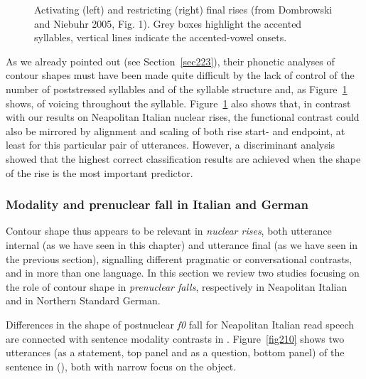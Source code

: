 \begin{figure}
\centering
{}
\caption{Activating (left) and restricting (right) final rises (from Dombrowski and Niebuhr 2005, Fig. 1). Grey boxes highlight the accented syllables, vertical lines indicate the accented-vowel onsets.}
\label{fig209}\end{figure}

As we already pointed out (see Section~\ref{sec223}), their phonetic analyses of contour shapes must have been made quite difficult by the lack of control of the number of poststressed syllables and of the syllable structure and, as Figure~\ref{fig209} shows, of voicing throughout the syllable. Figure~\ref{fig209} also shows that, in contrast with our results on Neapolitan Italian nuclear rises, the functional contrast could also be mirrored by alignment and scaling of both rise start- and endpoint, at least for this particular pair of utterances. However, a discriminant analysis showed that the highest correct classification results are achieved when the shape of the rise is the most important predictor.

\subsubsection{Modality and prenuclear fall in Italian and German}\label{sec2412}
Contour shape thus appears to be relevant in \textit{nuclear rises}, both utterance internal (as we have seen in this chapter) and utterance final (as we have seen in the previous section), signalling different pragmatic or conversational contrasts, and in more than one language. In this section we review two studies focusing on the role of contour shape in \textit{prenuclear falls}, respectively in Neapolitan Italian and in Northern Standard German.

Differences in the shape of postnuclear \textit{f0} fall for Neapolitan Italian read speech are connected with sentence modality contrasts in \citet{petrone2008tonal}. Figure~\ref{fig210} shows two utterances (as a statement, top panel and as a question, bottom panel) of the sentence in (), both with narrow focus on the object. 


